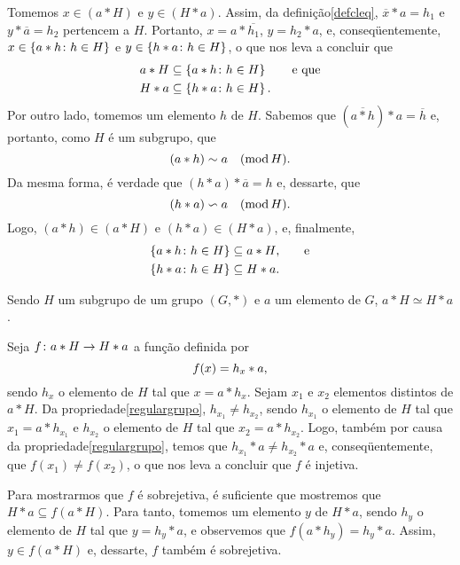 \begin{dem}
  Tomemos $x\in(a\ast H)$ e $y\in(H\ast a)$. Assim, da
  definição\xspace\ref{defcleq}, $\overline{x}\ast a = h_1$
  e $y\ast\overline{a} = h_2$ pertencem a $H$. Portanto,
  $x = a\ast\overline{h_1}$, $y = h_2\ast a$, e, conseqüentemente,
  $x\in\left\{ a\ast h\colon h\in H \right\}$ e $y\in\left\{ h\ast a\colon h\in H \right\}$, o que nos
  leva a concluir que
  \begin{equation*}
    \begin{aligned}
      a\ast H &\subseteq \left\{ a\ast h\colon h\in H \right\} \qquad\text{e que}\\
      H\ast a &\subseteq \left\{ h\ast a\colon h\in H \right\}\mathrm{.}
    \end{aligned}
  \end{equation*}
  Por outro lado, tomemos um elemento $h$ de $H$. Sabemos que
  $(\overline{a\ast h})\ast a = \overline{h}$
  e, portanto, como $H$ é um subgrupo, que
  \begin{equation*}
    \congmodright{(a\ast h)}{a}{H}\MMp
  \end{equation*}
  Da mesma forma, é verdade que
  $(h\ast a)\ast \overline{a} = h$
  e, dessarte, que
  \begin{equation*}
    \congmodleft{(h\ast a)}{a}{H}\MMp
  \end{equation*}
  Logo, $(a\ast h)\in (a\ast H)$ e $(h\ast a)\in (H\ast a)$, e,
  finalmente,
  \begin{equation*}
    \begin{aligned}
      \left\{ a\ast h\colon h\in H \right\} &\subseteq a\ast H \mathrm{,}\qquad\text{e}\\
      \left\{ h\ast a\colon h\in H \right\} &\subseteq H\ast a\mathrm{.}
    \end{aligned}
  \end{equation*}
\end{dem}

\begin{Cor}\label{coraHsimeqHa}
  Sendo $H$ um subgrupo de um grupo
  $(G,\ast)$ e $a$ um elemento de $G$, $a\ast H\simeq H\ast a$.
\end{Cor}

\begin{dem}
  Seja $f\colon a\ast H\rightarrow H\ast a$ a função definida por
  \begin{equation*}
    f(x) = h_x\ast a\mathrm{,}
  \end{equation*}
  sendo $h_x$ o elemento de $H$ tal que $x=a\ast h_x$. Sejam $x_1$ e
  $x_2$ elementos distintos de $a\ast H$. Da
  propriedade\xspace\ref{regulargrupo}, $h_{x_1}\neq h_{x_2}$, sendo
  $h_{x_1}$ o elemento de $H$ tal que $x_1=a\ast h_{x_1}$ e
  $h_{x_2}$ o elemento de $H$ tal que $x_2=a\ast h_{x_2}$. Logo, também
  por
  causa da propriedade\xspace\ref{regulargrupo}, temos
  que $h_{x_1}\ast a\neq h_{x_2}\ast a$ e, conseqüentemente, que
  $f(x_1)\neq f(x_2)$, o que nos leva a concluir que $f$ é injetiva.

  Para mostrarmos que $f$ é sobrejetiva, é suficiente que mostremos que
  $H\ast a\subseteq f(a\ast H)$. Para tanto, tomemos um elemento $y$ de
  $H\ast a$, sendo $h_y$ o elemento de $H$ tal que $y=h_y\ast a$, e
  observemos que $f(a\ast h_y) = h_y\ast a$. Assim, $y\in f(a\ast H)$ e,
  dessarte, $f$ também é sobrejetiva.
\end{dem}

